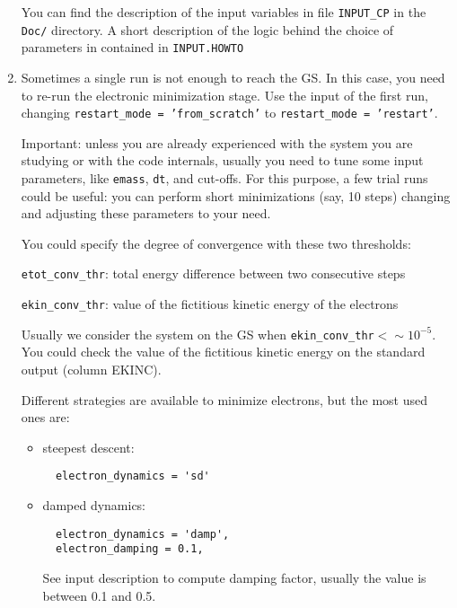 \documentclass[12pt,a4paper]{article}
\begin{document}
\begin{enumerate}
    You can find the description of the input variables in file
    \texttt{INPUT\_CP} in the \texttt{Doc/}
    directory. A short description of the logic behind the choice 
    of parameters in contained in \texttt{INPUT.HOWTO}

  \item
    Sometimes a single run is not enough to reach the GS.
    In this case, you need to re-run the electronic minimization
    stage.
    Use the input of the first run, changing \texttt{restart\_mode =
    'from\_scratch'} to \texttt{restart\_mode = 'restart'}.

    Important: unless you are already experienced with the system you
    are studying or with the code internals, usually you need to tune
    some input parameters, like \texttt{emass}, \texttt{dt}, and
    cut-offs.
    For this purpose, a few trial runs could be useful: you can
    perform short minimizations (say, 10 steps) changing and adjusting
    these parameters to your need.

    You could specify the degree of convergence with these two
    thresholds:

    \texttt{etot\_conv\_thr}: total energy difference between two
    consecutive steps

    \texttt{ekin\_conv\_thr}: value of the fictitious kinetic energy
    of the electrons

    Usually we consider the system on the GS when
    \texttt{ekin\_conv\_thr}${} < \sim 10^{-5}$.
    You could check the value of the fictitious kinetic energy on the 
    standard output (column EKINC).

    Different strategies are available to minimize electrons, but the
    most used ones are:
    \begin{itemize}
      \item
        steepest descent:
\begin{verbatim}
  electron_dynamics = 'sd'
\end{verbatim}
      \item
         damped dynamics:
\begin{verbatim}
  electron_dynamics = 'damp', 
  electron_damping = 0.1,
\end{verbatim}
         See input description to compute damping factor, usually the
         value is between 0.1 and 0.5.
    \end{itemize}


\end{enumerate}
\end{document}

